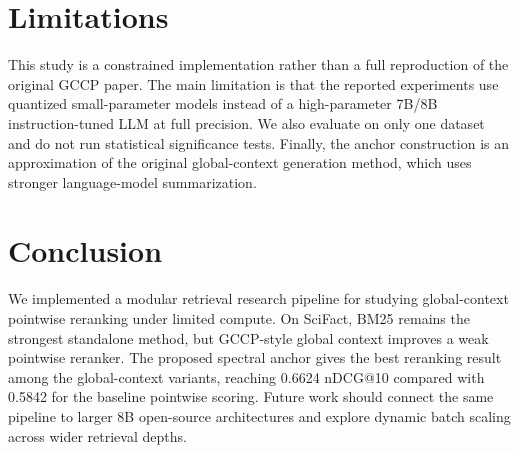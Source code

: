 \documentclass[11pt]{article}
\begin{document}
\section{Limitations}

This study is a constrained implementation rather than a full reproduction of the original GCCP paper. The main limitation is that the reported experiments use quantized small-parameter models instead of a high-parameter 7B/8B instruction-tuned LLM at full precision. We also evaluate on only one dataset and do not run statistical significance tests. Finally, the anchor construction is an approximation of the original global-context generation method, which uses stronger language-model summarization.

\section{Conclusion}

We implemented a modular retrieval research pipeline for studying global-context pointwise reranking under limited compute. On SciFact, BM25 remains the strongest standalone method, but GCCP-style global context improves a weak pointwise reranker. The proposed spectral anchor gives the best reranking result among the global-context variants, reaching 0.6624 nDCG@10 compared with 0.5842 for the baseline pointwise scoring. Future work should connect the same pipeline to larger 8B open-source architectures and explore dynamic batch scaling across wider retrieval depths.


\end{document}
